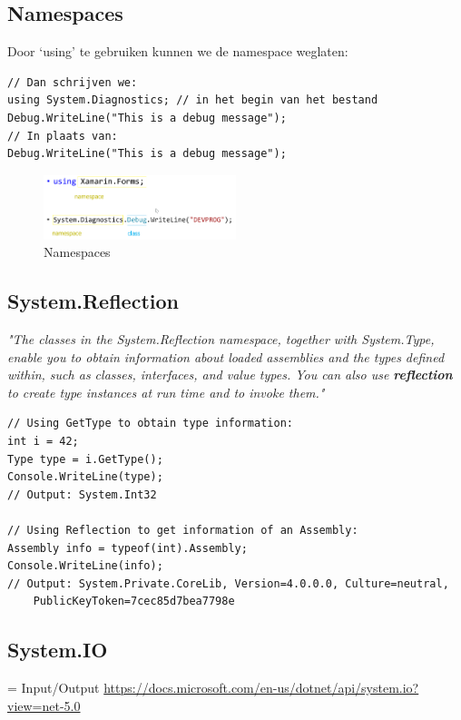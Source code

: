 \documentclass{article}
\newcommand{\bold}[1]{\textbf{#1}}
\begin{document}
\subsection{Namespaces}

Door `using' te gebruiken kunnen we de namespace weglaten:

\begin{verbatim}
// Dan schrijven we:
using System.Diagnostics; // in het begin van het bestand
Debug.WriteLine("This is a debug message");
// In plaats van:
Debug.WriteLine("This is a debug message");
\end{verbatim}

\begin{figure}[H]
    \centering
    \includegraphics[width=0.5\textwidth]{namespaces.png}
    \caption{Namespaces}
\end{figure}

\subsection{System.Reflection}

\textit{"The classes in the System.Reflection namespace, together with
System.Type, enable you to obtain information about loaded
assemblies and the types defined within, such as classes, interfaces,
and value types. You can also use \bold{reflection} to create type instances
at run time and to invoke them."}

\begin{verbatim}
// Using GetType to obtain type information:
int i = 42;
Type type = i.GetType();
Console.WriteLine(type);
// Output: System.Int32

// Using Reflection to get information of an Assembly:
Assembly info = typeof(int).Assembly;
Console.WriteLine(info);
// Output: System.Private.CoreLib, Version=4.0.0.0, Culture=neutral, 
    PublicKeyToken=7cec85d7bea7798e
\end{verbatim}

\subsection{System.IO}

= Input/Output \url{https://docs.microsoft.com/en-us/dotnet/api/system.io?view=net-5.0}
\end{document}
